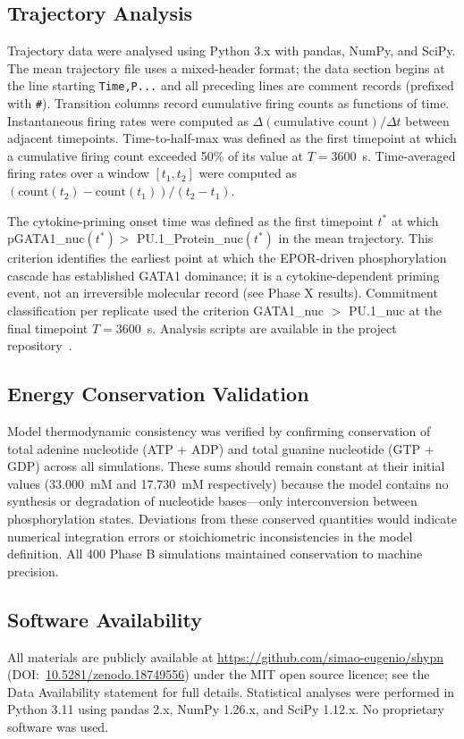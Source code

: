 \subsection{Trajectory Analysis}

Trajectory data were analysed using Python 3.x with pandas, NumPy, and SciPy. The mean trajectory file uses a mixed-header format; the data section begins at the line starting \texttt{Time,P...} and all preceding lines are comment records (prefixed with \texttt{\#}). Transition columns record cumulative firing counts as functions of time. Instantaneous firing rates were computed as $\Delta(\text{cumulative count}) / \Delta t$ between adjacent timepoints. Time-to-half-max was defined as the first timepoint at which a cumulative firing count exceeded 50\% of its value at $T = 3600$~s. Time-averaged firing rates over a window $[t_1, t_2]$ were computed as $(\text{count}(t_2) - \text{count}(t_1)) / (t_2 - t_1)$.

The cytokine-priming onset time was defined as the first timepoint $t^*$ at which pGATA1\_nuc$(t^*) >$ PU.1\_Protein\_nuc$(t^*)$ in the mean trajectory. This criterion identifies the earliest point at which the EPOR-driven phosphorylation cascade has established GATA1 dominance; it is a cytokine-dependent priming event, not an irreversible molecular record (see Phase X results). Commitment classification per replicate used the criterion GATA1\_nuc $>$ PU.1\_nuc at the final timepoint $T = 3600$~s. Analysis scripts are available in the project repository~\cite{shypn2026}.

\subsection{Energy Conservation Validation}

Model thermodynamic consistency was verified by confirming conservation of total adenine nucleotide (ATP + ADP) and total guanine nucleotide (GTP + GDP) across all simulations. These sums should remain constant at their initial values (33.000~mM and 17.730~mM respectively) because the model contains no synthesis or degradation of nucleotide bases---only interconversion between phosphorylation states. Deviations from these conserved quantities would indicate numerical integration errors or stoichiometric inconsistencies in the model definition. All 400 Phase B simulations maintained conservation to machine precision.

\subsection{Software Availability}

All materials are publicly available at \url{https://github.com/simao-eugenio/shypn} (DOI:~\href{https://doi.org/10.5281/zenodo.18749556}{10.5281/zenodo.18749556}) under the MIT open source licence; see the Data Availability statement for full details. Statistical analyses were performed in Python 3.11 using pandas 2.x, NumPy 1.26.x, and SciPy 1.12.x. No proprietary software was used.
